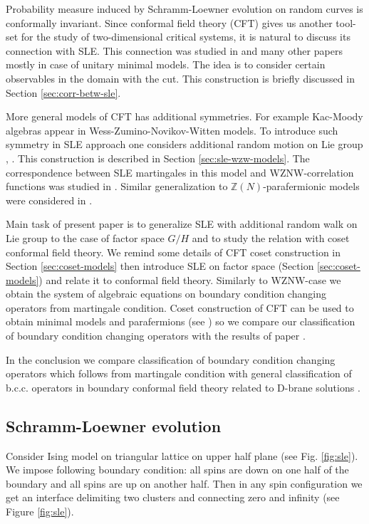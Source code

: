 \documentclass[a4paper]{jpconf}
\theoremstyle{definition}
\theoremstyle{definition} \newtheorem{Def}{Definition}
\begin{document}
Probability measure induced by Schramm-Loewner evolution on random curves is conformally invariant. Since conformal field theory (CFT) gives us another tool-set for the study of two-dimensional critical systems, it is natural to discuss its connection with SLE.  This connection  was studied in \cite{bauer2004conformal,bauer2004cfts,bauer2003sle,bauer2002sle} and many other papers mostly in case of unitary minimal models.
The idea is to consider certain observables in the domain with the cut. This construction is briefly discussed in Section \ref{sec:corr-betw-sle}. 

More general models of CFT has additional symmetries. For example Kac-Moody algebras  appear in Wess-Zumino-Novikov-Witten models. To introduce such symmetry in SLE approach one considers additional random motion on Lie group \cite{bettelheim2005stochastic}, \cite{Rasmussen:2004xr}. This construction is described in Section \ref{sec:sle-wzw-models}. The correspondence between SLE martingales in this model and WZNW-correlation functions was studied in \cite{alekseev2010sle}. Similar generalization to $\mathbb{Z}(N)$-parafermionic models were considered in \cite{santachiara2008sle,picco2008numerical}. 

Main task of present paper is to generalize SLE with additional random walk on Lie group to the case of factor space $G/H$ and to study the relation with coset conformal field theory. We remind some details of CFT coset construction in Section  \ref{sec:coset-models} then introduce SLE on factor space (Section \ref{sec:coset-models}) and relate it to conformal field theory. Similarly to WZNW-case we obtain the system of algebraic equations on boundary condition changing operators from martingale condition. 
Coset construction of CFT can be used to obtain minimal models and parafermions (see \cite{difrancesco1997cft}) so we compare our classification of boundary condition changing operators with the results of paper \cite{santachiara2008sle}.

In the conclusion we compare classification of boundary condition changing operators which follows from martingale condition with general classification of b.c.c. operators in boundary conformal field theory related to D-brane solutions \cite{fuchs2005geometry,fredenhagen2002d,elitzur2002d,Maldacena:2001ky,felder1999geometry,alekseev1999d}. 

\subsection{Schramm-Loewner evolution}
\label{sec:schr-loewn-evol}
Consider Ising model on triangular lattice on upper half plane (see Fig. \ref{fig:sle}). We impose following boundary condition: all spins are down on one half of the boundary and all spins are up on another half. Then in any spin configuration we get an interface delimiting two clusters and connecting zero and infinity (see Figure \ref{fig:sle}).
\end{document}
